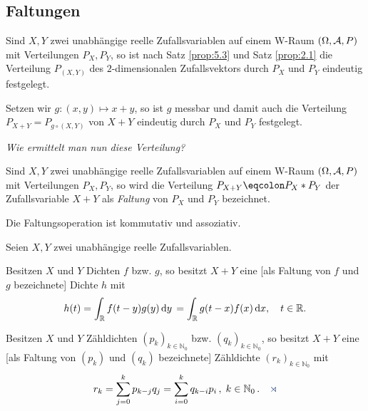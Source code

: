 \subsection{Faltungen}

Sind $X, Y$ zwei unabhängige reelle Zufallsvariablen auf einem
W-Raum $(\Omega, \AA, P)$ mit Verteilungen $P_{X}, P_{Y}$, so ist nach
Satz \ref{prop:5.3} und Satz \ref{prop:2.1} die Verteilung $P_{(X,Y)}$ des
$2$-dimensionalen Zufallsvektors durch $P_X$ und $P_Y$ eindeutig festgelegt.

Setzen wir $g : (x,y)\mapsto x+y$, so ist $g$ messbar und damit auch
die Verteilung $P_{X+Y}=P_{g\circ(X,Y)}$ von $X+Y$ eindeutig durch $P_X$ und
$P_Y$ festgelegt.

\textit{Wie ermittelt man nun diese Verteilung?} 

\begin{defn}
\label{defn:5.3}
Sind $X, Y$ zwei unabhängige reelle Zufallsvariablen auf einem
W-Raum $(\Omega, \AA, P)$ mit Verteilungen $P_{X}, P_{Y}$, so wird die
Verteilung $P_{X+Y} \defr P_{X} \ast P_{Y}$ der Zufallsvariable $X+Y$ als
\emph{Faltung} von $P_{X}$ und $P_{Y}$ bezeichnet.\fishhere
\end{defn}

\begin{bem}
\label{bem:5.5}
Die Faltungsoperation ist kommutativ und assoziativ.\maphere
\end{bem}

\begin{prop}
\label{prop:5.6}
Seien $X,Y$ zwei unabhängige reelle Zufallsvariablen.\\[-7mm]
\begin{propenum}
\item
Besitzen $X$ und $Y$ Dichten $f$ bzw. $g$, so besitzt $X+Y$ eine [als Faltung
von $f$ und $g$ bezeichnete] Dichte $h$ mit
\begin{align*}
h(t) =\int_{\R}f(t-y)g(y)\dy =
\int_{\R}g(t-x)f(x) \dx,\quad t \in \R.
\end{align*}
\item
Besitzen $X$ und $Y$ Zähldichten $(p_{k})_{k\in \mathbb{N}_{0}}$ bzw.
$(q_{k})_{k\in \mathbb{N}_{0}}$, so besitzt $X+Y$ eine [als Faltung von
$(p_{k})$ und $(q_{k})$ bezeichnete] Zähldichte $(r_{k})_{k\in \mathbb{N}_{0}}$
mit
\begin{align*}
r_{k}=\sum_{j=0}^ {k} p_{k-j}q_{j}=\sum\limits^ {k}_{i=0}q_{k-i}p_{i}\, , \;
k\in \mathbb{N}_{0}\, .\fishhere
\end{align*}
\end{propenum}
\end{prop}


